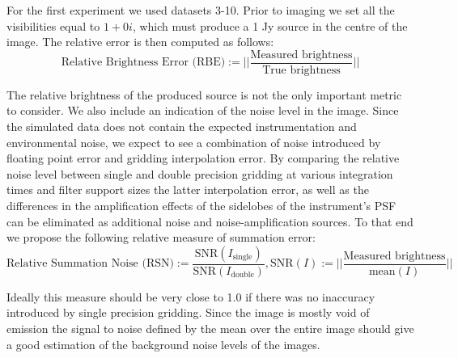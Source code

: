 For the first experiment we used datasets 3-10. Prior to imaging we set all the visibilities equal to $1+0i$, which must produce a 1 Jy source in the centre of the image. The relative error is then computed as
follows:
\begin{equation}
 \text{Relative Brightness Error (RBE)} := ||\frac{\text{Measured brightness}}{\text{True brightness}}||
\end{equation}

The relative brightness of the produced source is not the only important metric to consider. We also include an indication of the noise level in the image. Since the simulated data does not contain the expected
instrumentation and environmental noise, we expect to see a combination of noise introduced by floating point error and gridding interpolation error. By comparing the relative noise level between single and double 
precision gridding at various integration times and filter support sizes the latter interpolation error, as well as the differences in the amplification effects of the sidelobes of the instrument's PSF can be 
eliminated as additional noise and noise-amplification sources. To that end we propose the following relative measure of summation error:
\begin{equation}
 \text{Relative Summation Noise (RSN)} := \frac{\text{SNR}(I_\text{single})}{\text{SNR}(I_\text{double})}, \text{SNR}(I) := ||\frac{\text{Measured brightness}}{\text{mean}(I)}||
\end{equation}

Ideally this measure should be very close to 1.0 if there was no inaccuracy introduced by single precision gridding. Since the image is mostly void of emission the signal to noise defined by the mean
over the entire image should give a good estimation of the background noise levels of the images.

